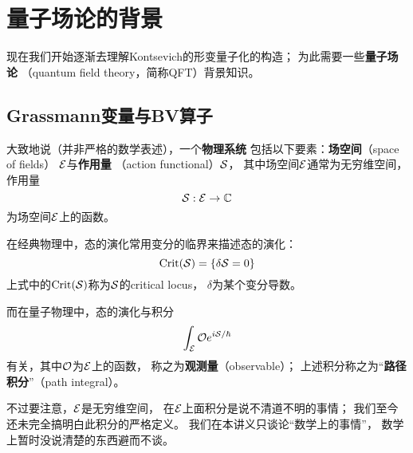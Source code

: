 \chapter{量子场论的背景}
现在我们开始逐渐去理解Kontsevich的形变量子化的构造；
为此需要一些\textbf{量子场论}
（quantum field theory，简称QFT）背景知识。


\section{Grassmann变量与BV算子}

大致地说（并非严格的数学表述），一个\textbf{物理系统}
包括以下要素：\textbf{场空间}（space of fields）
$\mathcal{E}$与\textbf{作用量}
（action functional）$\mathcal{S}$，
其中场空间$\mathcal{E}$通常为无穷维空间，作用量
$$\mathcal{S}:\mathcal{E}\to \mathbb{C}$$
为场空间$\mathcal{E}$上的函数。

在经典物理中，态的演化常用变分的临界来描述态的演化：
$$\operatorname{Crit}(\mathcal{S})=\{\delta\mathcal{S}=0\}$$
上式中的$\operatorname{Crit}(\mathcal{S})$称为$\mathcal{S}$的critical locus，
$\delta$为某个变分导数。

而在量子物理中，态的演化与积分
$$\int_{\mathcal{E}}\mathcal{O} e^{i\mathcal{S}/\hbar}$$
有关，其中$\mathcal{O}$为$\mathcal{E}$上的函数，
称之为\textbf{观测量}（observable）；
上述积分称之为“\textbf{路径积分}”（path integral）。

不过要注意，$\mathcal{E}$是无穷维空间，
在$\mathcal{E}$上面积分是说不清道不明的事情；
我们至今还未完全搞明白此积分的严格定义。
我们在本讲义只谈论“数学上的事情”，
数学上暂时没说清楚的东西避而不谈。



